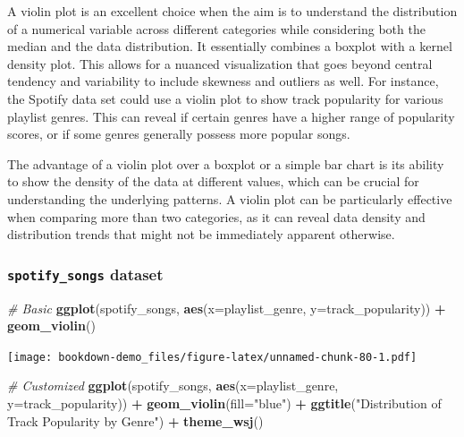 \documentclass[
  b5paper]{book}
\newenvironment{Shaded}{\begin{snugshade}}{\end{snugshade}}
\newcommand{\AttributeTok}[1]{\textcolor[rgb]{0.13,0.29,0.53}{#1}}
\newcommand{\CommentTok}[1]{\textcolor[rgb]{0.56,0.35,0.01}{\textit{#1}}}
\newcommand{\FunctionTok}[1]{\textcolor[rgb]{0.13,0.29,0.53}{\textbf{#1}}}
\newcommand{\NormalTok}[1]{#1}
\newcommand{\SpecialCharTok}[1]{\textcolor[rgb]{0.81,0.36,0.00}{\textbf{#1}}}
\newcommand{\StringTok}[1]{\textcolor[rgb]{0.31,0.60,0.02}{#1}}
\begin{document}
A violin plot is an excellent choice when the aim is to understand the distribution of a numerical variable across different categories while considering both the median and the data distribution. It essentially combines a boxplot with a kernel density plot. This allows for a nuanced visualization that goes beyond central tendency and variability to include skewness and outliers as well. For instance, the Spotify data set could use a violin plot to show track popularity for various playlist genres. This can reveal if certain genres have a higher range of popularity scores, or if some genres generally possess more popular songs.

The advantage of a violin plot over a boxplot or a simple bar chart is its ability to show the density of the data at different values, which can be crucial for understanding the underlying patterns. A violin plot can be particularly effective when comparing more than two categories, as it can reveal data density and distribution trends that might not be immediately apparent otherwise.

\hypertarget{spotify_songs-dataset-3}{%
\subsubsection*{\texorpdfstring{\texttt{spotify\_songs} dataset}{spotify\_songs dataset}}\label{spotify_songs-dataset-3}}

\begin{Shaded}
\begin{Highlighting}[]
\CommentTok{\# Basic}
\FunctionTok{ggplot}\NormalTok{(spotify\_songs, }\FunctionTok{aes}\NormalTok{(}\AttributeTok{x=}\NormalTok{playlist\_genre, }\AttributeTok{y=}\NormalTok{track\_popularity)) }\SpecialCharTok{+} \FunctionTok{geom\_violin}\NormalTok{()}
\end{Highlighting}
\end{Shaded}

\texttt{[image: bookdown-demo\_files/figure-latex/unnamed-chunk-80-1.pdf]}

\begin{Shaded}
\begin{Highlighting}[]
\CommentTok{\# Customized}
\FunctionTok{ggplot}\NormalTok{(spotify\_songs, }\FunctionTok{aes}\NormalTok{(}\AttributeTok{x=}\NormalTok{playlist\_genre, }\AttributeTok{y=}\NormalTok{track\_popularity)) }\SpecialCharTok{+} 
  \FunctionTok{geom\_violin}\NormalTok{(}\AttributeTok{fill=}\StringTok{"blue"}\NormalTok{) }\SpecialCharTok{+}
  \FunctionTok{ggtitle}\NormalTok{(}\StringTok{"Distribution of Track Popularity by Genre"}\NormalTok{) }\SpecialCharTok{+}
  \FunctionTok{theme\_wsj}\NormalTok{()}
\end{Highlighting}
\end{Shaded}
\end{document}
